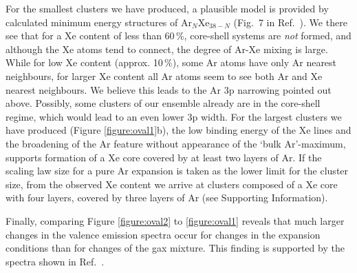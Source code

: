 For the smallest clusters we have produced, a plausible model is provided by calculated minimum energy structures of Ar$_N$Xe$_{38-N}$ (Fig.\ 7 in Ref.\ \cite{marques}).
We there see that for a Xe content of less than 60\,\%, core-shell systems are {\it not} formed, and although the Xe atoms tend to connect, the degree of Ar-Xe mixing is large.
While for low Xe content (approx. 10\,\%), some Ar atoms have only Ar nearest neighbours, for larger Xe content all Ar atoms seem to see both Ar and Xe nearest neighbours.
We believe this leads to the Ar 3p narrowing pointed out above.
Possibly, some clusters of our ensemble already are in the core-shell regime, which would lead to an even lower 3p width.
For the largest clusters we have produced (Figure \ref{figure:oval1}b), the low binding energy of the Xe lines and the broadening of the Ar feature without appearance of the `bulk Ar'-maximum, supports formation of a Xe core covered by at least two layers of Ar.
If the scaling law size for a pure Ar expansion is taken as the lower limit for the cluster size, from the observed Xe content we arrive at clusters composed of a Xe core with four layers, covered by three layers of Ar (see Supporting Information).

Finally, comparing Figure \ref{figure:oval2} to \ref{figure:oval1} reveals that much larger changes in the valence emission spectra occur for changes in the expansion conditions than for changes of the gax mixture.
This finding is supported by the spectra shown in Ref.\ \cite{lindblad}.
%
%
